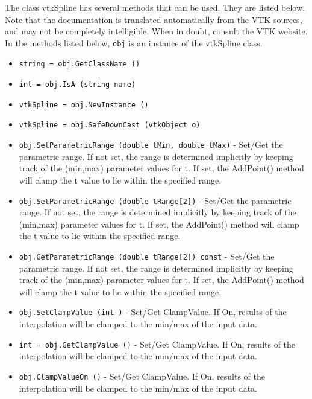 The class vtkSpline has several methods that can be used.
  They are listed below.
Note that the documentation is translated automatically from the VTK sources,
and may not be completely intelligible.  When in doubt, consult the VTK website.
In the methods listed below, \verb|obj| is an instance of the vtkSpline class.
\begin{itemize}
\item  \verb|string = obj.GetClassName ()|

\item  \verb|int = obj.IsA (string name)|

\item  \verb|vtkSpline = obj.NewInstance ()|

\item  \verb|vtkSpline = obj.SafeDownCast (vtkObject o)|

\item  \verb|obj.SetParametricRange (double tMin, double tMax)| -  Set/Get the parametric range. If not set, the range is determined
 implicitly by keeping track of the (min,max) parameter values for
 t. If set, the AddPoint() method will clamp the t value to lie
 within the specified range.

\item  \verb|obj.SetParametricRange (double tRange[2])| -  Set/Get the parametric range. If not set, the range is determined
 implicitly by keeping track of the (min,max) parameter values for
 t. If set, the AddPoint() method will clamp the t value to lie
 within the specified range.

\item  \verb|obj.GetParametricRange (double tRange[2]) const| -  Set/Get the parametric range. If not set, the range is determined
 implicitly by keeping track of the (min,max) parameter values for
 t. If set, the AddPoint() method will clamp the t value to lie
 within the specified range.

\item  \verb|obj.SetClampValue (int )| -  Set/Get ClampValue. If On, results of the interpolation will be
 clamped to the min/max of the input data.

\item  \verb|int = obj.GetClampValue ()| -  Set/Get ClampValue. If On, results of the interpolation will be
 clamped to the min/max of the input data.

\item  \verb|obj.ClampValueOn ()| -  Set/Get ClampValue. If On, results of the interpolation will be
 clamped to the min/max of the input data.


\end{itemize}
